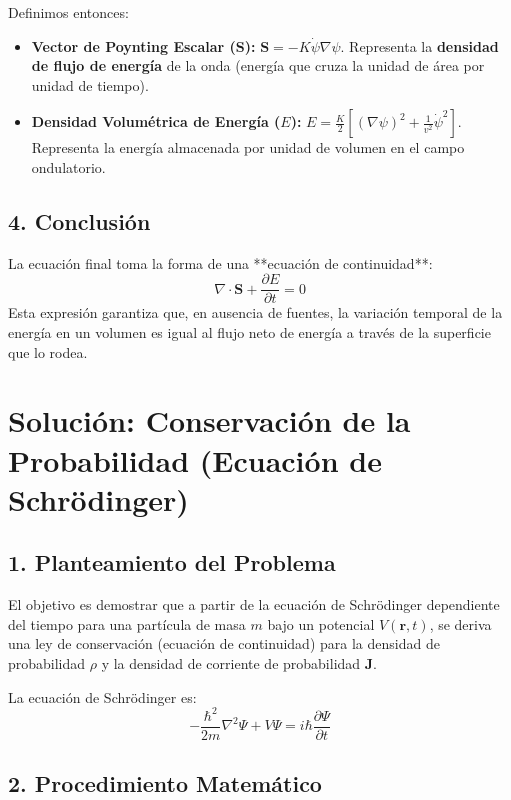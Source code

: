 \documentclass[a4paper]{article}
\begin{document}
Definimos entonces:
\begin{itemize}
    \item \textbf{Vector de Poynting Escalar ($\mathbf{S}$):} $\mathbf{S} = -K\dot{\psi}\nabla\psi$. Representa la \textbf{densidad de flujo de energía} de la onda (energía que cruza la unidad de área por unidad de tiempo).
    \item \textbf{Densidad Volumétrica de Energía ($E$):} $E = \frac{K}{2} [(\nabla\psi)^2 + \frac{1}{v^2} \dot{\psi}^2]$. Representa la energía almacenada por unidad de volumen en el campo ondulatorio.
\end{itemize}

\subsection*{4. Conclusión}
La ecuación final toma la forma de una **ecuación de continuidad**:
\begin{equation}
    \nabla \cdot \mathbf{S} + \frac{\partial E}{\partial t} = 0
\end{equation}
Esta expresión garantiza que, en ausencia de fuentes, la variación temporal de la energía en un volumen es igual al flujo neto de energía a través de la superficie que lo rodea.

\section*{Solución: Conservación de la Probabilidad (Ecuación de Schrödinger)}

\subsection*{1. Planteamiento del Problema}
El objetivo es demostrar que a partir de la ecuación de Schrödinger dependiente del tiempo para una partícula de masa $m$ bajo un potencial $V(\mathbf{r}, t)$, se deriva una ley de conservación (ecuación de continuidad) para la densidad de probabilidad $\rho$ y la densidad de corriente de probabilidad $\mathbf{J}$.

La ecuación de Schrödinger es:
\begin{equation}
    -\frac{\hbar^2}{2m} \nabla^2\Psi + V\Psi = i\hbar \frac{\partial\Psi}{\partial t}
\end{equation}

\subsection*{2. Procedimiento Matemático}
\end{document}
